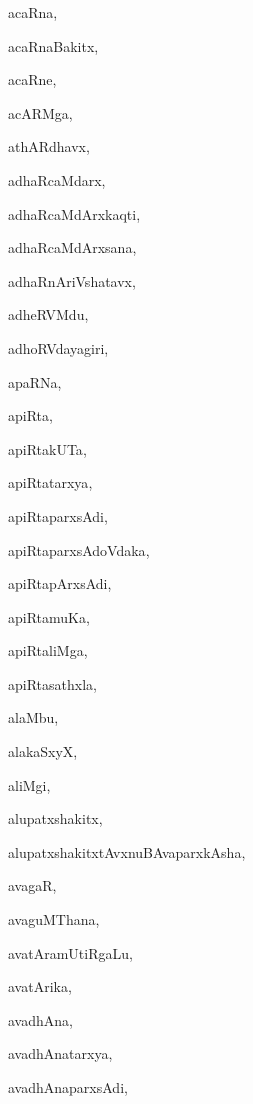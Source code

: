 \begin{multicols}{2}
{acaRna}, \pageref{acaRna}

{acaRnaBakitx}, \pageref{acaRnaBakitx}

{acaRne}, \pageref{acaRne}

{acARMga}, \pageref{acARMga}

{athARdhavx}, \pageref{athARdhavx}

{adhaRcaMdarx}, \pageref{adhaRcaMdarx}

{adhaRcaMdArxkaqti}, \pageref{adhaRcaMdArxkaqti}

{adhaRcaMdArxsana}, \pageref{adhaRcaMdArxsana}

{adhaRnAriVshatavx}, \pageref{adhaRnAriVshatavx}

{adheRVMdu}, \pageref{adheRVMdu}

{adhoRVdayagiri}, \pageref{adhoRVdayagiri}

{apaRNa}, \pageref{apaRNa}

{apiRta}, \pageref{apiRta}

{apiRtakUTa}, \pageref{apiRtakUTa}

{apiRtatarxya}, \pageref{apiRtatarxya}

{apiRtaparxsAdi}, \pageref{apiRtaparxsAdi}

{apiRtaparxsAdoVdaka}, \pageref{apiRtaparxsAdoVdaka}

{apiRtapArxsAdi}, \pageref{apiRtapArxsAdi}

{apiRtamuKa}, \pageref{apiRtamuKa}

{apiRtaliMga}, \pageref{apiRtaliMga}

{apiRtasathxla}, \pageref{apiRtasathxla}

{alaMbu}, \pageref{alaMbu}

{alakaSxyX}, \pageref{alakaSxyX}

{aliMgi}, \pageref{aliMgi}

{alupatxshakitx}, \pageref{alupatxshakitx}

{alupatxshakitxtAvxnuBAvaparxkAsha}, \pageref{alupatxshakitxtAvxnuBAvaparxkAsha}

{avagaR}, \pageref{avagaR}

{avaguMThana}, \pageref{avaguMThana}

{avatAramUtiRgaLu}, \pageref{avatAramUtiRgaLu}

{avatArika}, \pageref{avatArika}

{avadhAna}, \pageref{avadhAna}

{avadhAnatarxya}, \pageref{avadhAnatarxya}

{avadhAnaparxsAdi}, \pageref{avadhAnaparxsAdi}


\end{multicols}
